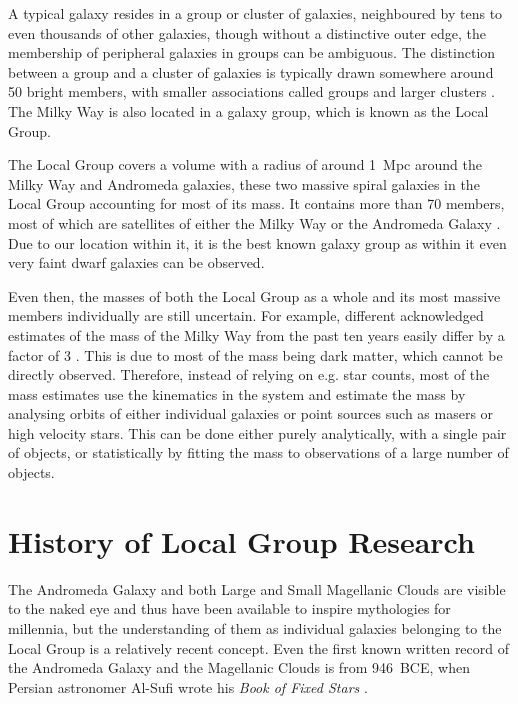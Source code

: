 \documentclass[english, twoside]{HYgradu}
\begin{document}
A typical galaxy resides in a group or cluster of galaxies, neighboured by tens to even thousands of other galaxies, though without a distinctive outer edge, the membership of peripheral galaxies in groups can be ambiguous. The distinction between a group and a cluster of galaxies is typically drawn somewhere around 50 bright members, with smaller associations called groups and larger clusters \citep{mo2010galaxy, binney2008galactic}. The Milky Way is also located in a galaxy group, which is known as the Local Group.

The Local Group covers a volume with a radius of around 1~Mpc around the Milky Way and Andromeda galaxies, these two massive spiral galaxies in the Local Group accounting for most of its mass. It contains more than 70 members, most of which are satellites of either the Milky Way or the Andromeda Galaxy \citep{mcconnachie2012observed}. Due to our location within it, it is the best known galaxy group as within it even very faint dwarf galaxies can be observed.

Even then, the masses of both the Local Group as a whole and its most massive members individually are still uncertain. For example, different acknowledged estimates of the mass of the Milky Way from the past ten years easily differ by a factor of 3 \citep{wang2015estimating}. This is due to most of the mass being dark matter, which cannot be directly observed. Therefore, instead of relying on e.g. star counts, most of the mass estimates use the kinematics in the system and estimate the mass by analysing orbits of either individual galaxies or point sources such as masers or high velocity stars. This can be done either purely analytically, with a single pair of objects, or statistically by fitting the mass to observations of a large number of objects.


\section{History of Local Group Research}


The Andromeda Galaxy and both Large and Small Magellanic Clouds are visible to the naked eye and thus have been available to inspire mythologies for millennia, but the understanding of them as individual galaxies belonging to the Local Group is a relatively recent concept. Even the first known written record of the Andromeda Galaxy and the Magellanic Clouds is from 946~BCE, when Persian astronomer Al-Sufi wrote his \textit{Book of Fixed Stars} \citep{schultz2012andromeda, ihsan2011abdul}.
\end{document}
